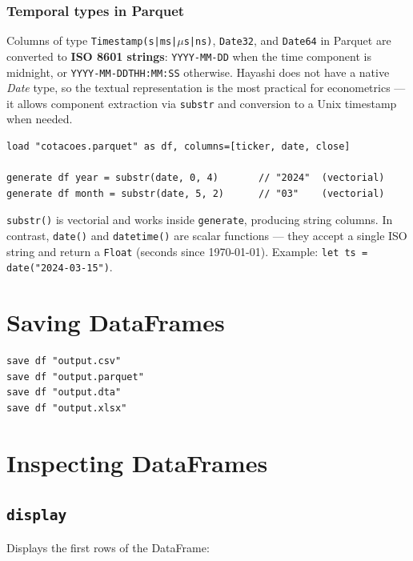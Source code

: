 \subsubsection*{Temporal types in Parquet}

Columns of type \texttt{Timestamp(s|ms|$\mu$s|ns)}, \texttt{Date32}, and
\texttt{Date64} in Parquet are converted to \textbf{ISO 8601 strings}:
\texttt{YYYY-MM-DD} when the time component is midnight, or
\texttt{YYYY-MM-DDTHH:MM:SS} otherwise. Hayashi does not have a native
\textit{Date} type, so the textual representation is the most practical for
econometrics --- it allows component extraction via \texttt{substr} and
conversion to a Unix timestamp when needed.

\begin{lstlisting}[caption={Extracting date components}]
load "cotacoes.parquet" as df, columns=[ticker, date, close]

generate df year = substr(date, 0, 4)       // "2024"  (vectorial)
generate df month = substr(date, 5, 2)      // "03"    (vectorial)
\end{lstlisting}

\begin{nota}
  \texttt{substr()} is vectorial and works inside \texttt{generate}, producing
  string columns. In contrast, \texttt{date()} and \texttt{datetime()} are
  scalar functions --- they accept a single ISO string and return a \texttt{Float}
  (seconds since 1970-01-01). Example: \texttt{let ts = date("2024-03-15")}.
\end{nota}

\section{Saving DataFrames}

\begin{lstlisting}
save df "output.csv"
save df "output.parquet"
save df "output.dta"
save df "output.xlsx"
\end{lstlisting}

\section{Inspecting DataFrames}

\subsection*{\texttt{display}}

Displays the first rows of the DataFrame:


